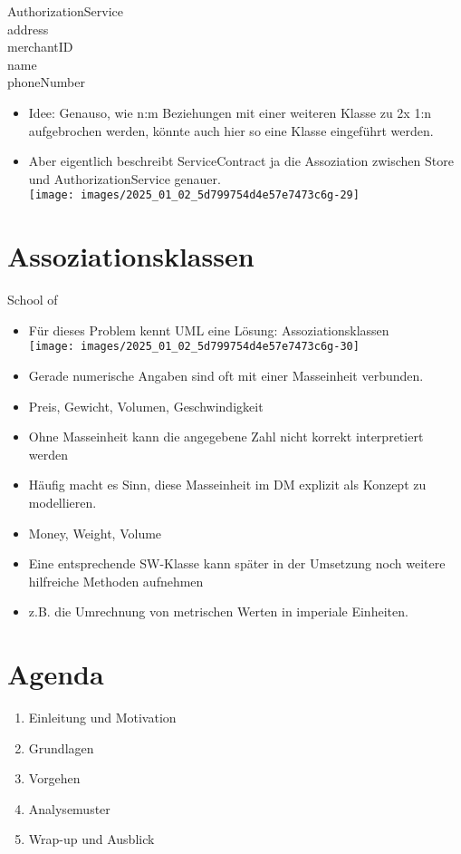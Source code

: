 \documentclass[10pt]{article}
\begin{document}
AuthorizationService\\
address\\
merchantID\\
name\\
phoneNumber

\begin{itemize}
  \item Idee: Genauso, wie n:m Beziehungen mit einer weiteren Klasse zu 2x 1:n aufgebrochen werden, könnte auch hier so eine Klasse eingeführt werden.
  \item Aber eigentlich beschreibt ServiceContract ja die Assoziation zwischen Store und AuthorizationService genauer.\\
\texttt{[image: images/2025\_01\_02\_5d799754d4e57e7473c6g-29]}
\end{itemize}

\section*{Assoziationsklassen}
School of

\begin{itemize}
  \item Für dieses Problem kennt UML eine Lösung: Assoziationsklassen\\
\texttt{[image: images/2025\_01\_02\_5d799754d4e57e7473c6g-30]}
  \item Gerade numerische Angaben sind oft mit einer Masseinheit verbunden.
  \item Preis, Gewicht, Volumen, Geschwindigkeit
  \item Ohne Masseinheit kann die angegebene Zahl nicht korrekt interpretiert werden
  \item Häufig macht es Sinn, diese Masseinheit im DM explizit als Konzept zu modellieren.
  \item Money, Weight, Volume
  \item Eine entsprechende SW-Klasse kann später in der Umsetzung noch weitere hilfreiche Methoden aufnehmen
  \item z.B. die Umrechnung von metrischen Werten in imperiale Einheiten.
\end{itemize}

\section*{Agenda}
\begin{enumerate}
  \item Einleitung und Motivation
  \item Grundlagen
  \item Vorgehen
  \item Analysemuster
  \item Wrap-up und Ausblick
\end{enumerate}
\end{document}

